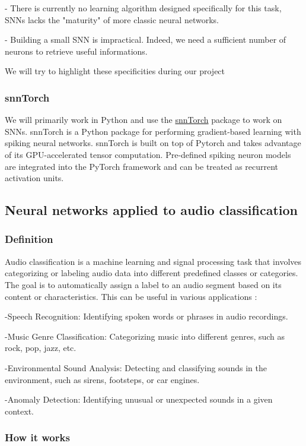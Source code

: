 \documentclass[11pt]{article}
\begin{document}
- There is currently no learning algorithm designed specifically for this task, SNNs lacks the "maturity" of more classic neural networks.

- Building a small SNN is impractical. Indeed, we need a sufficient number of neurons to retrieve useful informations.

We will try to highlight these specificities during our project

\subsubsection{snnTorch}
We will primarily work in Python and use the \hyperref[item:snntorch-lib]{snnTorch} package to work on SNNs. snnTorch is a Python package for performing gradient-based learning with spiking neural networks. snnTorch is built on top of Pytorch and takes advantage of its GPU-accelerated tensor computation. Pre-defined spiking neuron models are integrated into the PyTorch framework and can be treated as recurrent activation units.


\subsection{Neural networks applied to audio classification}
\subsubsection{Definition}
Audio classification is a machine learning and signal processing task that involves categorizing or labeling audio data into different predefined classes or categories. The goal is to automatically assign a label to an audio segment based on its content or characteristics. This can be useful in various applications :

-Speech Recognition: Identifying spoken words or phrases in audio recordings.

-Music Genre Classification: Categorizing music into different genres, such as rock, pop, jazz, etc.

-Environmental Sound Analysis: Detecting and classifying sounds in the environment, such as sirens, footsteps, or car engines.

-Anomaly Detection: Identifying unusual or unexpected sounds in a given context.

\subsubsection{How it works}
\end{document}
